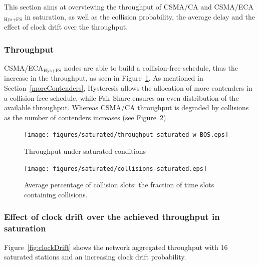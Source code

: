 \documentclass[a4paper,journal]{IEEEtran}
\begin{document}
	This section aims at overviewing the throughput of CSMA/CA and CSMA/ECA$_{\text{Hys+FS}}$  in saturation, as well as the collision probability, the average delay and the effect of clock drift over the throughput.
	\\
	\subsubsection{Throughput}
	CSMA/ECA$_{\text{Hys+FS}}$ nodes are able to build a collision-free schedule, thus the increase in the throughput, as seen in Figure~\ref{fig:throughput-sat}. As mentioned in Section~\ref{moreContenders}, Hysteresis allows the allocation of more contenders in a collision-free schedule, while Fair Share ensures an even distribution of the available throughput. Whereas CSMA/CA throughput is degraded by collisions as the number of contenders increases (see Figure~\ref{fig:collisions-sat}).
	
	\begin{figure}[htbp]
	\centering
		\texttt{[image: figures/saturated/throughput-saturated-w-BOS.eps]}
		\caption{Throughput under saturated conditions}
		\label{fig:throughput-sat}
	\end{figure}
	
	\begin{figure}[htbp]
	\centering
		\texttt{[image: figures/saturated/collisions-saturated.eps]}
		\caption{Average percentage of collision slots: the fraction of time slots containing collisions.}
		\label{fig:collisions-sat}
	\end{figure}
	
	\subsubsection{Effect of clock drift over the achieved throughput in saturation}
	Figure~\ref{fig:clockDrift} shows the network aggregated throughput with 16 saturated stations and an increasing clock drift probability.
	
\end{document}
